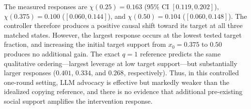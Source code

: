 The measured responses are $\chi(0.25)=0.163$ (95\% CI $[0.119,0.202]$), $\chi(0.375)=0.100$ ($[0.060,0.144]$), and $\chi(0.50)=0.104$ ($[0.060,0.148]$). The controller therefore produces a positive causal shift toward its target at all three matched states. However, the largest response occurs at the lowest tested target fraction, and increasing the initial target support from $x_0=0.375$ to $0.50$ produces no additional gain. The exact $q=1$ reference predicts the same qualitative ordering---largest leverage at low target support---but substantially larger responses ($0.401$, $0.334$, and $0.268$, respectively). Thus, in this controlled one-round setting, LLM advocacy is effective but markedly weaker than the idealized copying reference, and there is no evidence that additional pre-existing social support amplifies the intervention response.
